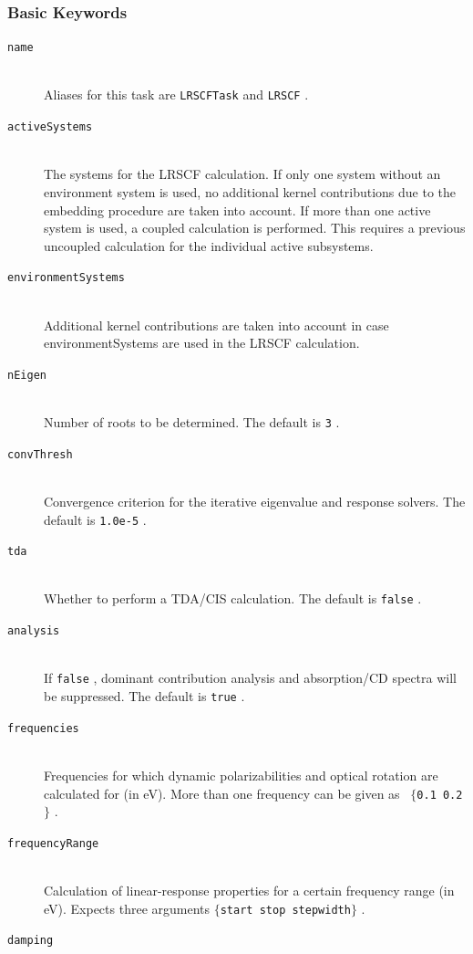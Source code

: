 \documentclass[bibliography=totocnumbered,a4paper,10pt,oneside]{scrbook}
\newcommand{\ttt}[1]{%
  \begingroup\setlength{\fboxsep}{1pt}%
  \colorbox{serenity-green!30}{\texttt{\hspace*{2pt}\vphantom{(g}#1\hspace*{2pt}}}%
  \endgroup
}
\begin{document}
\subsubsection{Basic Keywords}
\begin{description}
    \item [\texttt{name}]\hfill \\
    Aliases for this task are \ttt{LRSCFTask} and \ttt{LRSCF}.
    \item [\texttt{activeSystems}]\hfill \\
    The systems for the LRSCF calculation. If only one system without an environment system is used, no additional kernel contributions due to the embedding procedure are taken into account. If more than one active system is used, a coupled calculation is performed. This requires a previous uncoupled calculation for the individual active subsystems.
    \item [\texttt{environmentSystems}]\hfill \\
    Additional kernel contributions are taken into account in case environmentSystems are used in the LRSCF calculation.
    \item [\texttt{nEigen}]\hfill \\
    Number of roots to be determined. The default is \ttt{3}.
    \item [\texttt{convThresh}]\hfill \\
    Convergence criterion for the iterative eigenvalue and response solvers. The default is \ttt{1.0e-5}.
    \item [\texttt{tda}]\hfill \\
    Whether to perform a TDA/CIS calculation. The default is \ttt{false}.
    \item [\texttt{analysis}]\hfill \\
    If \ttt{false}, dominant contribution analysis and absorption/CD spectra will be suppressed. The default is \ttt{true}.
    \item [\texttt{frequencies}]\hfill \\
    Frequencies for which dynamic polarizabilities and optical rotation are calculated for (in eV). More than one frequency can be given as~\ttt{$\{$0.1 0.2$\}$}.
    \item [\texttt{frequencyRange}]\hfill \\
    Calculation of linear-response properties for a certain frequency range (in eV). Expects three arguments \ttt{$\{$start stop stepwidth$\}$}.
    \item [\texttt{damping}]\hfill \\

\end{description}
\end{document}
